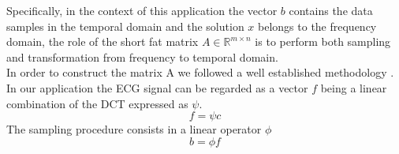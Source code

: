\documentclass[journal,article,submit,electronics,pdftex]{Definitions/mdpi}
\begin{document}
Specifically, in the context of this application the vector $b$ contains the data samples in the temporal domain and the solution $x$ belongs to the frequency domain, the role of the short fat matrix $A \in \mathbb{R}^{m \times n}$ is to perform both sampling and transformation from frequency to temporal domain.\\
In order to construct the matrix A we followed a well established methodology \cite{matrixA,candes}. In our application the ECG signal can be regarded as a vector $f$ being a linear combination of the DCT expressed as $\psi$.
\begin{equation}
f = \psi c
\end{equation}
The sampling procedure consists in a linear operator $\phi$
\begin{equation}
b = \phi f
\end{equation}
\end{document}
